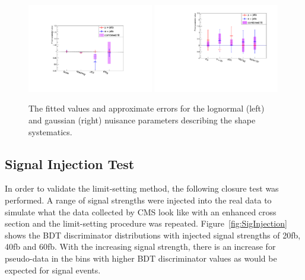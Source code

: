 \begin{figure}[ht!]
    \includegraphics[width=0.49\textwidth]{images/Run1/FitParams_compare_lognorm2.pdf}
      \includegraphics[width=0.49\textwidth]{images/Run1/FitParams_compare_truncgaus.pdf}
    \caption{The fitted values and approximate errors for the lognormal (left) and gaussian (right) nuisance parameters describing the shape systematics.}
    \label{fig:comparefittedparams}
\end{figure}

\subsection{Signal Injection Test}
\label{sec:signalinjection}
In order to validate the limit-setting method, the following closure test was performed. A range of signal strengths were injected into the real data to simulate what the data collected by CMS look like with an enhanced \tttt cross section and the limit-setting procedure was repeated. Figure~\ref{fig:SigInjection} shows the BDT discriminator distributions with injected signal strengths of 20fb, 40fb and 60fb. With the increasing signal strength, there is an increase for pseudo-data in the bins with higher BDT discriminator values as would be expected for signal events.


